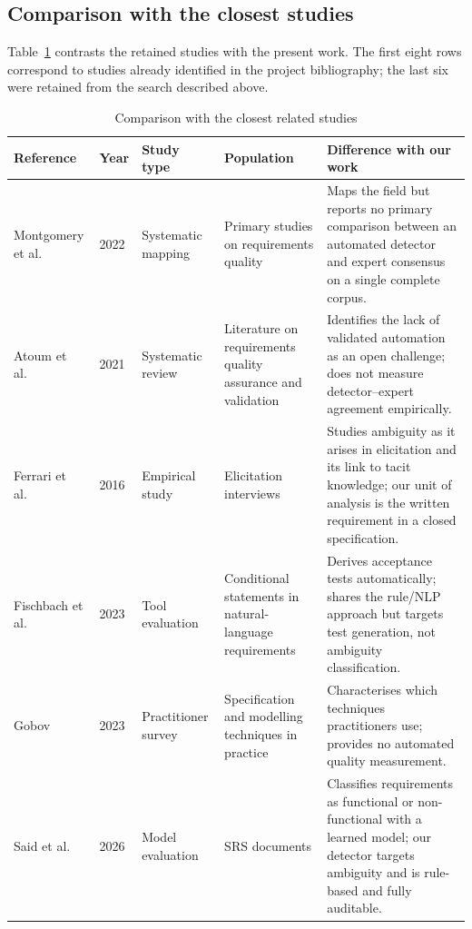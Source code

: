 \documentclass[pdflatex,sn-mathphys-num]{sn-jnl}
\theoremstyle{thmstyleone}%
\theoremstyle{thmstyletwo}%
\theoremstyle{thmstylethree}%
\begin{document}
	\subsection{Comparison with the closest studies}\label{subsec:comparison}
	
	Table~\ref{tab:related} contrasts the retained studies with the present work.
	The first eight rows correspond to studies already identified in the project
	bibliography; the last six were retained from the search described above.
	
	\begin{table}[h]
		\caption{Comparison with the closest related studies}\label{tab:related}
		\begin{tabular}{@{}p{2.1cm}p{0.7cm}p{2.2cm}p{2.4cm}p{4.0cm}@{}}
			\toprule
			Reference & Year & Study type & Population & Difference with our work \\
			\midrule
			Montgomery et al.~\cite{montgomery2022} & 2022 & Systematic mapping &
			Primary studies on requirements quality & Maps the field but reports no primary
			comparison between an automated detector and expert consensus on a single
			complete corpus. \\
			Atoum et al.~\cite{atoum2021} & 2021 & Systematic review & Literature on
			requirements quality assurance and validation & Identifies the lack of validated
			automation as an open challenge; does not measure detector--expert agreement
			empirically. \\
			Ferrari et al.~\cite{ferrari2016} & 2016 & Empirical study & Elicitation
			interviews & Studies ambiguity as it arises in elicitation and its link to tacit
			knowledge; our unit of analysis is the written requirement in a closed
			specification. \\
			Fischbach et al.~\cite{fischbach2023} & 2023 & Tool evaluation & Conditional
			statements in natural-language requirements & Derives acceptance tests
			automatically; shares the rule/NLP approach but targets test generation, not
			ambiguity classification. \\
			Gobov~\cite{gobov2023} & 2023 & Practitioner survey & Specification and
			modelling techniques in practice & Characterises which techniques practitioners
			use; provides no automated quality measurement. \\
			Said et al.~\cite{said2026} & 2026 & Model evaluation & SRS documents &
			Classifies requirements as functional or non-functional with a learned model;
			our detector targets ambiguity and is rule-based and fully auditable. \\

\end{tabular}
\end{table}
\end{document}
